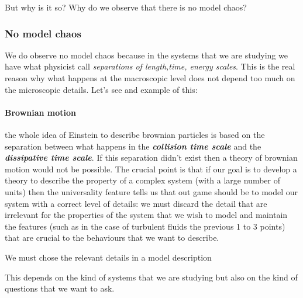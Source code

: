 \documentclass[\main/main.tex]{subfiles}
\begin{document}
But why is it so? Why do we observe that there is no model chaos?

\subsubsection{No model chaos}
We do observe no model chaos because in the systems that we are studying we have what physicist call \textit{separations of length,time, energy scales}. This is the real reason why what happens at the macroscopic level does not depend too much on the microscopic details. Let's see and example of this:
\paragraph{Brownian motion}
the whole idea of Einstein to describe brownian particles is based on the separation between  what happens in the \textbf{\textit{collision time scale}} and the \textbf{\textit{dissipative time scale}}. If this separation didn't exist then a theory of brownian motion would not be possible.
\medskip
The crucial point is that if our goal is to develop a theory to describe the property of a complex system (with a large number of units) then the universality feature tells us that out game should be to model our system with a correct level of details: we must discard the detail that are irrelevant for the properties of the system that we wish to model and maintain the features (such as in the case of turbulent fluids the previous 1 to 3 points) that are crucial to the behaviours that we want to describe.

\begin{center}
    We must chose the relevant details in a model description
\end{center}

This depends on the kind of systems that we are studying but also on the kind of questions that we want to ask.
\end{document}
